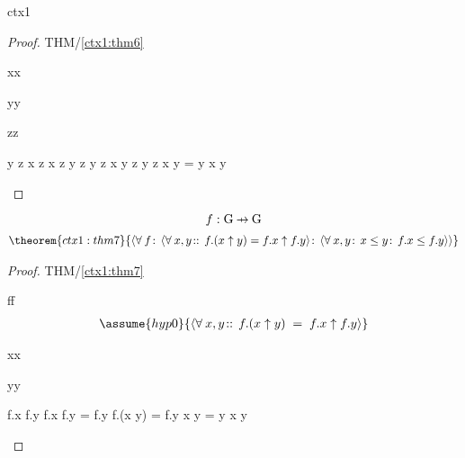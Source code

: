 \documentclass[12pt]{amsart}
\begin{document}
\begin{context}{ctx1}
\begin{proof}{THM/\ref{ctx1:thm6}}
	\begin{free:var}{x}{x}
	\begin{free:var}{y}{y}
	\begin{free:var}{z}{z}
\begin{calculation}
		y \le z \1\implies x \le z
		x \le z \1\land y \le z \2\equiv y \le z
		x \uparrow y \le z \2\equiv y \le z
		x \uparrow y = y
	\hint{=}{ \eqref{ctx1:thm5} }
		x  \le y
\end{calculation}
	\end{free:var}
	\end{free:var}
	\end{free:var}
\end{proof}

\[ \dummy{ f : \G \pfun \G } \]
%
\begin{align}
\theorem{ctx1:thm7}{ \qforall{f}{\qforall{x,y}{}{ f.(x \uparrow y) = f.x \uparrow f.y } }{ \qforall{x,y}{ x \le y }{ f.x \le f.y } } }
\end{align}

\begin{proof}{THM/\ref{ctx1:thm7}}
	\begin{free:var}{f}{f}
	\begin{align}
	\assume{hyp0}{ \qforall{x,y}{}{ 
		f.(x \uparrow y) \1= f.x \uparrow f.y } } 
	\hide{ \goal{ \qforall{x,y}{ x \le y }{ f.x \le f.y } } }
	\end{align}
	\begin{free:var}{x}{x}
	\begin{free:var}{y}{y}
\begin{calculation}
		f.x \le f.y
	\hint{=}{ \eqref{ctx1:thm5} }
		f.x \uparrow f.y \1= f.y
	\hint{=}{ \eqref{hyp0} }
		f.(x \uparrow y) \1 = f.y
		x \uparrow y \1= y
	\hint{=}{ \eqref{ctx1:thm5} }
		x  \le y
\end{calculation}
	\end{free:var}
	\end{free:var}
	\end{free:var}
\end{proof}


\end{context}
\end{document}
